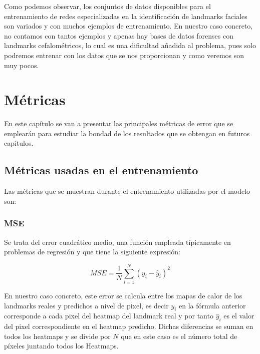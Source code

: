                 \medskip

                \noindent Como podemos observar, los conjuntos de datos disponibles para el entrenamiento de redes especializadas en la identificación de landmarks faciales son variados y con muchos ejemplos de entrenamiento. En nuestro caso concreto, no contamos con tantos ejemplos y apenas hay bases de datos forenses con landmarks cefalométricos, lo cual es una dificultad añadida al problema, pues solo podremos entrenar con los datos que se nos proporcionan y como veremos son muy pocos.

\section{Métricas}

\noindent En este capítulo se van a presentar las principales métricas de error que se emplearán para estudiar la bondad de los resultados que se obtengan en futuros capítulos.

    \subsection{Métricas usadas en el entrenamiento}
        \noindent Las métricas que se muestran durante el entrenamiento utilizadas por el modelo son:

        \subsubsection{MSE}
            \noindent Se trata del error cuadrático medio, una función empleada típicamente en problemas de regresión y que tiene la siguiente expresión: 

            \begin{equation}
                MSE = \frac{1}{N} \sum_{i=1}^{N} (y_i - \widehat{y}_i)^2
            \end{equation}

            \noindent En nuestro caso concreto, este error se calcula entre los mapas de calor de los landmarks reales y predichos a nivel de pixel, es decir $y_i$ en la fórmula anterior corresponde a cada pixel del heatmap del landmark real y por tanto $\widehat{y}_i$ es el valor del pixel correspondiente en el heatmap predicho. Dichas diferencias se suman en todos los heatmaps y se divide por $N$ que en este caso es el número total de píxeles juntando todos los Heatmaps.

            \medskip


